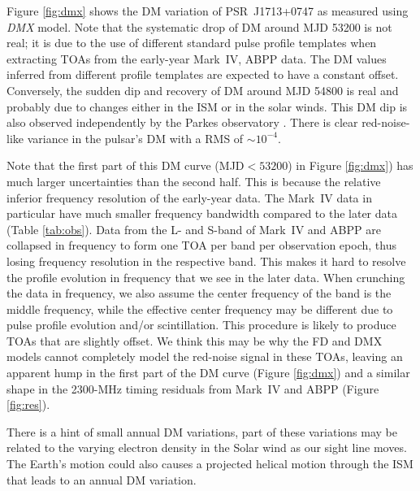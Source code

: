 Figure \ref{fig:dmx} shows the DM variation of PSR~J1713+0747 as measured
using {\it DMX} model.
Note that the systematic drop of DM around MJD 53200 is not real; it is due to
the use of different standard pulse profile templates when extracting 
TOAs from the early-year Mark~IV, ABPP data. The DM values inferred from different
profile templates are expected to have a constant offset.
Conversely, the sudden dip and recovery of DM around MJD 54800 is real and probably
due to changes either in the ISM or in the solar winds. This DM dip is also
observed independently by the Parkes observatory \citep{kcs+13}.
There is clear red-noise-like variance in the pulsar's DM with a RMS of
$\sim10^{-4}$. 

Note that the first part of this DM curve (MJD$<53200$) in
Figure \ref{fig:dmx}) has much larger uncertainties than the second half.
This is because the relative inferior frequency resolution of the early-year
data. The Mark~IV data in particular have much smaller frequency bandwidth 
compared to the later data (Table \ref{tab:obs}).
Data from the L- and S-band of Mark~IV and ABPP are collapsed in frequency to
form one TOA per band per observation epoch, thus losing frequency resolution
in the respective band. This makes it hard to resolve the profile evolution in
frequency that we see in the later data. When crunching the data in frequency, we
also assume the center frequency of the band is the middle frequency, while the effective center frequency may be different due to pulse
profile evolution and/or scintillation. This procedure is likely to produce TOAs that are slightly offset. We think this may be why the FD and
DMX models cannot completely model the red-noise signal in these TOAs, leaving
an apparent hump in the first part of the DM curve (Figure \ref{fig:dmx}) and 
a similar shape in the 2300-MHz timing residuals from Mark~IV and ABPP (Figure
\ref{fig:res}).

There is a hint of small annual DM variations, part of these variations may be 
related to the varying electron density in the Solar wind as our sight line moves.
The Earth's motion could also causes a projected helical motion through the ISM
that leads to an annual DM variation.

